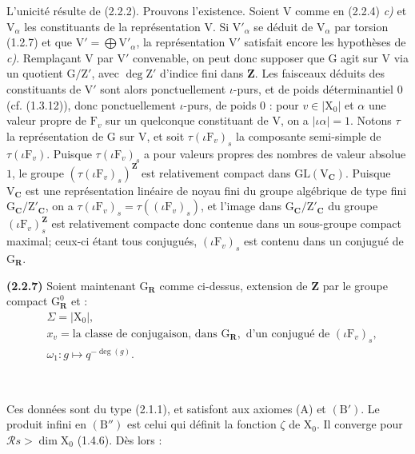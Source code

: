 \documentclass[11pt,leqno]{article}
\newcommand{\Page}[1]{\ifvmode\noindent\else\unskip\ \fi{\footnotesize\textcolor{gray}{[p.\,#1]}}\ \ignorespaces}
\begin{document}
L’unicité résulte de (2.2.2). Prouvons l’existence. Soient \(\mathrm V\) comme en (2.2.4) \textit{c)} et \(\mathrm V_\alpha\) les constituants de la représentation \(\mathrm V\). Si \(\mathrm V'_\alpha\) se déduit de \(\mathrm V_\alpha\) par torsion (1.2.7) et que \(\mathrm V'=\bigoplus\mathrm V'_\alpha\), la représentation \(\mathrm V'\) satisfait encore les hypothèses de \textit{c)}. Remplaçant \(\mathrm V\) par \(\mathrm V'\) convenable, on peut donc supposer que \(\mathrm G\) agit sur \(\mathrm V\) via un quotient \(\mathrm G/\mathrm Z'\), avec \(\deg\mathrm Z'\) d’indice fini dans \(\mathbf Z\). Les faisceaux déduits des constituants de \(\mathrm V'\) sont alors ponctuellement \(\iota\)-purs, et de poids déterminantiel \(0\) (cf. (1.3.12)), donc ponctuellement \(\iota\)-purs, de poids \(0\) : pour \(v\in|\mathrm X_0|\) et \(\alpha\) une valeur propre de \(\mathrm F_v\) sur un quelconque constituant de \(\mathrm V\), on a \(|\iota\alpha|=1\). Notons \(\tau\) la représentation de \(\mathrm G\) sur \(\mathrm V\), et soit \(\tau(\iota\mathrm F_v)_s\) la composante semi-simple de \(\tau(\iota\mathrm F_v)\). Puisque \(\tau(\iota\mathrm F_v)_s\) a pour valeurs propres des nombres de valeur absolue \(1\), le groupe \((\tau(\iota\mathrm F_v)_s)^{\mathbf Z}\) est relativement compact dans \(\mathrm{GL}(\mathrm V_{\mathbf C})\). Puisque \(\mathrm V_{\mathbf C}\) est une représentation linéaire de noyau fini du groupe algébrique de type fini \(\mathrm G_{\mathbf C}/\mathrm Z'_{\mathbf C}\), on a \(\tau(\iota\mathrm F_v)_s=\tau((\iota\mathrm F_v)_s)\), et l’image dans \(\mathrm G_{\mathbf C}/\mathrm Z'_{\mathbf C}\) du groupe \((\iota\mathrm F_v)_s^{\mathbf Z}\) est relativement compacte donc contenue dans un sous-groupe compact maximal; ceux-ci étant tous conjugués, \((\iota\mathrm F_v)_s\) est contenu dans un conjugué de \(\mathrm G_{\mathbf R}\).

\textbf{(2.2.7)} Soient maintenant \(\mathrm G_{\mathbf R}\) comme ci-dessus, extension de \(\mathbf Z\) par le groupe compact \(\mathrm G_{\mathbf R}^0\) et :
\[
\begin{aligned}
&\Sigma=|\mathrm X_0|,\\
&x_v=\text{la classe de conjugaison, dans }\mathrm G_{\mathbf R},
  \text{ d’un conjugué de }(\iota\mathrm F_v)_s,\\
&\omega_1:g\mapsto q^{-\deg(g)}.
\end{aligned}
\]

\Page{195}

Ces données sont du type (2.1.1), et satisfont aux axiomes (A) et \((\mathrm B')\). Le produit infini en \((\mathrm B'')\) est celui qui définit la fonction \(\zeta\) de \(\mathrm X_0\). Il converge pour \(\mathscr R s>\dim\mathrm X_0\) (1.4.6). Dès lors :
\end{document}
